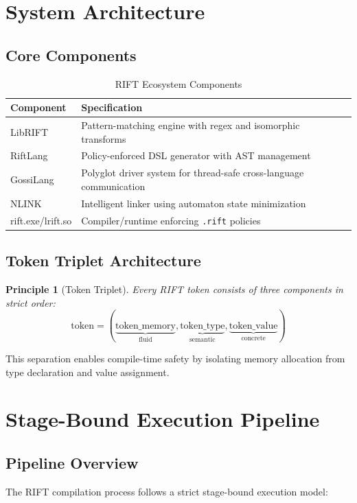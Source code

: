 \documentclass[12pt]{article}
\newtheorem{principle}{Principle}
\begin{document}
\section{System Architecture}

\subsection{Core Components}
\begin{table}[H]
\centering
\caption{RIFT Ecosystem Components}
\begin{tabular}{|l|p{8cm}|}
\hline
\textbf{Component} & \textbf{Specification} \\
\hline
LibRIFT & Pattern-matching engine with regex and isomorphic transforms \\
\hline
RiftLang & Policy-enforced DSL generator with AST management \\
\hline
GossiLang & Polyglot driver system for thread-safe cross-language communication \\
\hline
NLINK & Intelligent linker using automaton state minimization \\
\hline
rift.exe/lrift.so & Compiler/runtime enforcing \texttt{.rift} policies \\
\hline
\end{tabular}
\end{table}

\subsection{Token Triplet Architecture}
\begin{principle}[Token Triplet]
Every RIFT token consists of three components in strict order:
\[
\text{token} = (\underbrace{\text{token\_memory}}_{\text{fluid}}, \underbrace{\text{token\_type}}_{\text{semantic}}, \underbrace{\text{token\_value}}_{\text{concrete}})
\]
\end{principle}

This separation enables compile-time safety by isolating memory allocation from type declaration and value assignment.

\section{Stage-Bound Execution Pipeline}

\subsection{Pipeline Overview}
The RIFT compilation process follows a strict stage-bound execution model:
\end{document}
